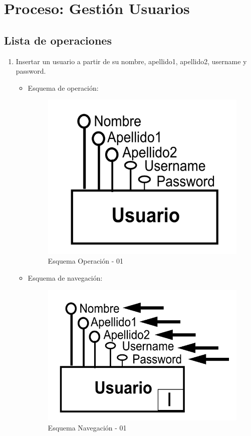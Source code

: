\documentclass[a4paper,12pt]{report}
\begin{document}
\section{Proceso: Gestión Usuarios}
\label{sec-7-8}
\subsection{Lista de operaciones}
\label{sec-7-8-1}
\begin{enumerate}
\item Insertar un usuario a partir de su nombre, apellido1, apellido2,
username y password.
\begin{itemize}
\item Esquema de operación:
\begin{figure}[!htp]
\centering
\includegraphics[width=0.9\linewidth]{./operaciones/img/Usuarios/01_ope.png}
\caption{Esquema Operación - 01}
\label{fig:ope01}
\medskip
\footnotesize
{}
\end{figure}
\item Esquema de navegación:
\begin{figure}[!htp]
\centering
\includegraphics[width=0.9\linewidth]{./operaciones/img/Usuarios/01_nav.png}
\caption{Esquema Navegación - 01}
\label{fig:nave01}
\medskip
\footnotesize
{}
\end{figure}
\end{itemize}


\end{enumerate}
\end{document}
